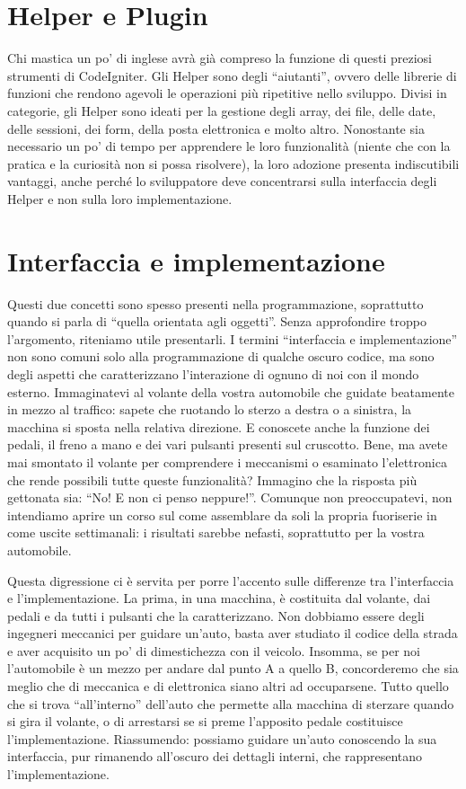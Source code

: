\section{Helper e Plugin}
\label{cap:helper}

Chi mastica un po' di inglese avrà già compreso la funzione di questi preziosi strumenti di CodeIgniter. Gli Helper sono degli ``aiutanti'', ovvero delle librerie di funzioni che rendono agevoli le operazioni più ripetitive nello sviluppo. Divisi in categorie, gli Helper sono ideati per la gestione degli array, dei file, delle date, delle sessioni, dei form, della posta elettronica e molto altro. Nonostante sia necessario un po' di tempo per apprendere le loro funzionalità (niente che con la pratica e la curiosità non si possa risolvere), la loro adozione presenta indiscutibili vantaggi, anche perché lo sviluppatore deve concentrarsi sulla interfaccia degli Helper e non sulla loro implementazione.

\section{Interfaccia e implementazione}
Questi due concetti sono spesso presenti nella programmazione, soprattutto quando si parla di ``quella orientata agli oggetti''. Senza approfondire troppo l'argomento, riteniamo utile presentarli. I termini ``interfaccia e implementazione'' non sono comuni solo alla programmazione di qualche oscuro codice, ma sono degli aspetti che caratterizzano l'interazione di ognuno di noi con il mondo esterno. Immaginatevi al volante della vostra automobile che guidate beatamente in mezzo al traffico: sapete che ruotando lo sterzo a destra o a sinistra, la macchina si sposta nella relativa direzione. E conoscete anche la funzione dei pedali, il freno a mano e dei vari pulsanti presenti sul cruscotto. Bene, ma avete mai smontato il volante per comprendere i meccanismi o esaminato l'elettronica che rende possibili tutte queste funzionalità? Immagino che la risposta più gettonata sia: ``No! E non ci penso neppure!''. Comunque non preoccupatevi, non intendiamo aprire un corso sul come assemblare da soli la propria fuoriserie in come uscite settimanali: i risultati sarebbe nefasti, soprattutto per la vostra automobile.

Questa digressione ci è servita per porre l'accento sulle differenze tra l'interfaccia e l'implementazione. La prima, in una macchina, è costituita dal volante, dai pedali e da tutti i pulsanti che la caratterizzano. Non dobbiamo essere degli ingegneri meccanici per guidare un'auto, basta aver studiato il codice della strada e aver acquisito un po' di dimestichezza con il veicolo. Insomma, se per noi l'automobile è un mezzo per andare dal punto A a quello B, concorderemo che sia meglio che di meccanica e di elettronica siano altri ad occuparsene. Tutto quello che si trova ``all'interno'' dell'auto che permette alla macchina di sterzare quando si gira il volante, o di arrestarsi se si preme l'apposito pedale costituisce l'implementazione. Riassumendo: possiamo guidare un'auto conoscendo la sua interfaccia, pur rimanendo all'oscuro dei dettagli interni, che rappresentano l'implementazione.

